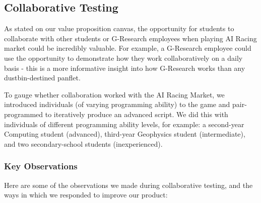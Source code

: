 \subsection{Collaborative Testing}

As stated on our value proposition canvas, the opportunity for students to collaborate with other students or G-Research employees when playing AI Racing market could be incredibly valuable. For example, a G-Research employee could use the opportunity to demonstrate how they work collaboratively on a daily basis - this is a more informative insight into how G-Research works than any dustbin-destined panflet.

To gauge whether collaboration worked with the AI Racing Market, we introduced individuals (of varying programming ability) to the game and pair-programmed to iteratively produce an advanced script. We did this with individuals of different programming ability levels, for example: a second-year Computing student (advanced), third-year Geophysics student (intermediate), and two secondary-school students (inexperienced). 

\subsubsection{Key Observations}

Here are some of the observations we made during collaborative testing, and the ways in which we responded to improve our product: \\


